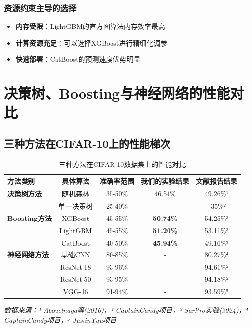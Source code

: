 \documentclass[UTF8]{report}
\theoremstyle{MyLineTheoremStyle} %
\theoremstyle{MyBlockTheoremStyle} %
\theoremstyle{MySubsubsectionStyle} %
\begin{document}
\subsubsection{资源约束主导的选择}
\begin{itemize}
    \item \textbf{内存受限}：LightGBM的直方图算法内存效率最高
    \item \textbf{计算资源充足}：可以选择XGBoost进行精细化调参
    \item \textbf{快速部署}：CatBoost的预测速度优势明显
\end{itemize}



\section{决策树、Boosting与神经网络的性能对比}
\subsection{三种方法在CIFAR-10上的性能梯次}
\begin{table}[H]
    \centering
    \caption{三种方法在CIFAR-10数据集上的性能对比}
    \begin{tabular}{lcccc}
        \toprule
        方法类别 & 具体算法 & 准确率范围 & 我们的实验结果 & 文献报告结果 \\
        \midrule
        \textbf{决策树方法} & 随机森林 & 35-50\% & 46.54\% & 49.26\%¹ \\
         & 单一决策树 & 25-40\% & - & ~35\%² \\
        \textbf{Boosting方法} & XGBoost & 45-55\% & \textbf{50.74\%} & 54.25\%³ \\
         & LightGBM & 45-55\% & \textbf{51.20\%} & 53.11\%³ \\
         & CatBoost & 40-50\% & \textbf{45.94\%} & 49.16\%³ \\
        \textbf{神经网络方法} & 基础CNN & 80-85\% & - & 80.27\%⁴ \\
         & ResNet-18 & 93-96\% & - & 94.61\%⁵ \\
         & ResNet-50 & 93-95\% & - & 94.18\%⁵ \\
         & VGG-16 & 91-94\% & - & 93.59\%⁵ \\
        \bottomrule
    \end{tabular}
\end{table}
\textit{数据来源：¹ Abouelnaga等(2016)，² CaptainCandy项目，³ SarPro实验(2024)，⁴ CaptainCandy项目，⁵ JustinYuu项目}
\end{document}
